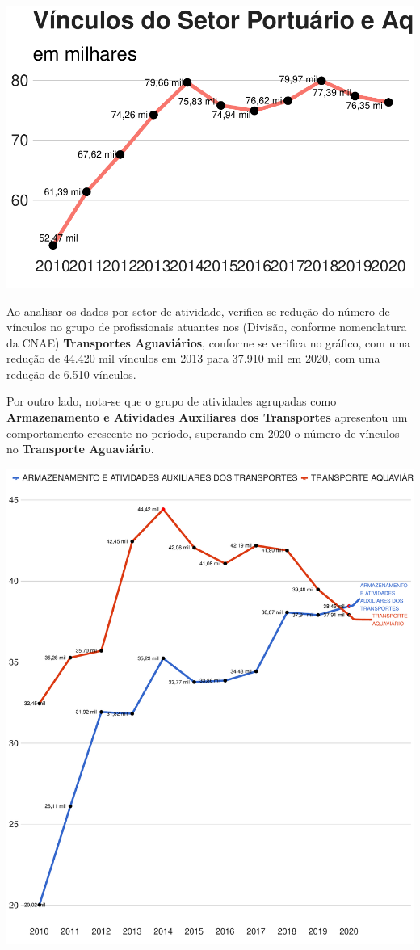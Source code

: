 \documentclass[
]{article}
\begin{document}
\includegraphics{mercado_trabalho_files/figure-latex/g_secao-1.pdf}

Ao analisar os dados por setor de atividade, verifica-se redução do
número de vínculos no grupo de profissionais atuantes nos (Divisão,
conforme nomenclatura da CNAE) \textbf{Transportes Aguaviários},
conforme se verifica no gráfico, com uma redução de 44.420 mil vínculos
em 2013 para 37.910 mil em 2020, com uma redução de 6.510 vínculos.

Por outro lado, nota-se que o grupo de atividades agrupadas como
\textbf{Armazenamento e Atividades Auxiliares dos Transportes}
apresentou um comportamento crescente no período, superando em 2020 o
número de vínculos no \textbf{Transporte Aguaviário}.

\includegraphics{mercado_trabalho_files/figure-latex/g_divisao-1.pdf}
\end{document}
